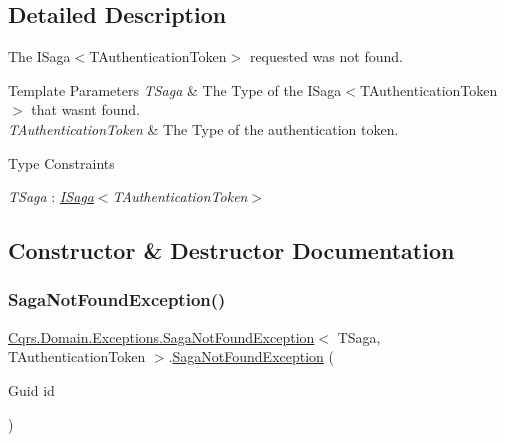 \subsection{Detailed Description}
The I\+Saga$<$\+T\+Authentication\+Token$>$ requested was not found. 


\begin{DoxyTemplParams}{Template Parameters}
{\em T\+Saga} & The Type of the I\+Saga$<$\+T\+Authentication\+Token$>$ that wasn\textquotesingle{}t found.\\
\hline
{\em T\+Authentication\+Token} & The Type of the authentication token.\\
\hline
\end{DoxyTemplParams}
\begin{Desc}
\item[Type Constraints]\begin{description}
\item[{\em T\+Saga} : {\em \hyperlink{interfaceCqrs_1_1Domain_1_1ISaga}{I\+Saga}$<$T\+Authentication\+Token$>$}]\end{description}
\end{Desc}


\subsection{Constructor \& Destructor Documentation}
\mbox{\label{classCqrs_1_1Domain_1_1Exceptions_1_1SagaNotFoundException_a329725b9034ccf3167b667383fb8718a_a329725b9034ccf3167b667383fb8718a}} 
\subsubsection{\texorpdfstring{Saga\+Not\+Found\+Exception()}{SagaNotFoundException()}}
{\footnotesize\ttfamily \hyperlink{classCqrs_1_1Domain_1_1Exceptions_1_1SagaNotFoundException}{Cqrs.\+Domain.\+Exceptions.\+Saga\+Not\+Found\+Exception}$<$ T\+Saga, T\+Authentication\+Token $>$.\hyperlink{classCqrs_1_1Domain_1_1Exceptions_1_1SagaNotFoundException}{Saga\+Not\+Found\+Exception} (\begin{DoxyParamCaption}\item[{Guid}]{id }\end{DoxyParamCaption})}




